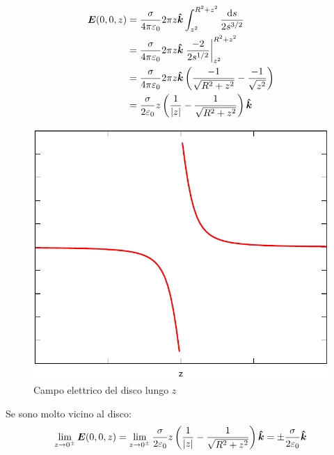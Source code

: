 \begin{Es}[Disco]
\begin{align*}
 \boldsymbol{E}(0,0,z) &=\frac{\sigma}{4\pi\varepsilon_0}2\pi z\boldsymbol{\hat {k}}\int_{z^2}^{R^2+z^2}\frac{\mathrm{d} s}{2s^{3/2}}\\
 &=\frac{\sigma}{4\pi\varepsilon_0}2\pi z\boldsymbol{\hat {k}}\left.\frac{-2}{2s^{1/2}}\right|_{z^2}^{R^2+z^2}\\
 &=\frac{\sigma}{4\pi\varepsilon_0}2\pi z\boldsymbol{\hat {k}}\left(\frac{-1}{\sqrt{R^2+z^2}}-\frac{-1}{\sqrt{z^2}}\right)\\
 &=\frac{\sigma}{2\varepsilon_0} z\left(\frac{1}{|z|}-\frac{1}{\sqrt{R^2+z^2}}\right)\boldsymbol{\hat {k}}
\end{align*}
\begin{figure}[htbp]
 \centering
 \includegraphics[scale=0.5]{immagini/fisica2/potenziale_disco}
 \caption{Campo elettrico del disco lungo $z$}
\end{figure}

Se sono molto vicino al disco:
\begin{equation*}
 \lim_{z\to 0^\pm}\boldsymbol{E}(0,0,z)=\lim_{z\to 0^\pm} \frac{\sigma}{2\varepsilon_0} z\left(\frac{1}{|z|}-\frac{1}{\sqrt{R^2+z^2}}\right)\boldsymbol{\hat {k}}=\pm\frac{\sigma}{2\varepsilon_0}\boldsymbol{\hat {k}}
\end{equation*}
\end{Es}
